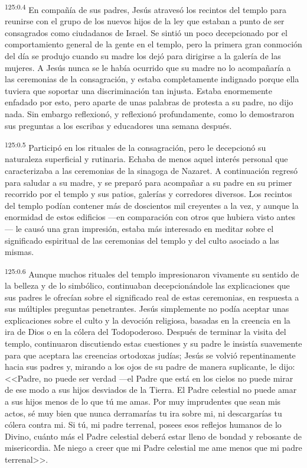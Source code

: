 \par 
\textsuperscript{125:0.4} En compañía de sus padres, Jesús atravesó los recintos del templo para reunirse con el grupo de los nuevos hijos de la ley que estaban a punto de ser consagrados como ciudadanos de Israel. Se sintió un poco decepcionado por el comportamiento general de la gente en el templo, pero la primera gran conmoción del día se produjo cuando su madre los dejó para dirigirse a la galería de las mujeres. A Jesús nunca se le había ocurrido que su madre no lo acompañaría a las ceremonias de la consagración, y estaba completamente indignado porque ella tuviera que soportar una discriminación tan injusta. Estaba enormemente enfadado por esto, pero aparte de unas palabras de protesta a su padre, no dijo nada. Sin embargo reflexionó, y reflexionó profundamente, como lo demostraron sus preguntas a los escribas y educadores una semana después.

\par 
\textsuperscript{125:0.5} Participó en los rituales de la consagración, pero le decepcionó su naturaleza superficial y rutinaria. Echaba de menos aquel interés personal que caracterizaba a las ceremonias de la sinagoga de Nazaret. A continuación regresó para saludar a su madre, y se preparó para acompañar a su padre en su primer recorrido por el templo y sus patios, galerías y corredores diversos. Los recintos del templo podían contener más de doscientos mil creyentes a la vez, y aunque la enormidad de estos edificios ---en comparación con otros que hubiera visto antes--- le causó una gran impresión, estaba más interesado en meditar sobre el significado espiritual de las ceremonias del templo y del culto asociado a las mismas.

\par 
\textsuperscript{125:0.6} Aunque muchos rituales del templo impresionaron vivamente su sentido de la belleza y de lo simbólico, continuaban decepcionándole las explicaciones que sus padres le ofrecían sobre el significado real de estas ceremonias, en respuesta a sus múltiples preguntas penetrantes. Jesús simplemente no podía aceptar unas explicaciones sobre el culto y la devoción religiosa, basadas en la creencia en la ira de Dios o en la cólera del Todopoderoso. Después de terminar la visita del templo, continuaron discutiendo estas cuestiones y su padre le insistía suavemente para que aceptara las creencias ortodoxas judías; Jesús se volvió repentinamente hacia sus padres y, mirando a los ojos de su padre de manera suplicante, le dijo: <<Padre, no puede ser verdad ---el Padre que está en los cielos no puede mirar de ese modo a sus hijos desviados de la Tierra. El Padre celestial no puede amar a sus hijos menos de lo que tú me amas. Por muy imprudentes que sean mis actos, sé muy bien que nunca derramarías tu ira sobre mi, ni descargarías tu cólera contra mi. Si tú, mi padre terrenal, posees esos reflejos humanos de lo Divino, cuánto más el Padre celestial deberá estar lleno de bondad y rebosante de misericordia. Me niego a creer que mi Padre celestial me ame menos que mi padre terrenal>>.

